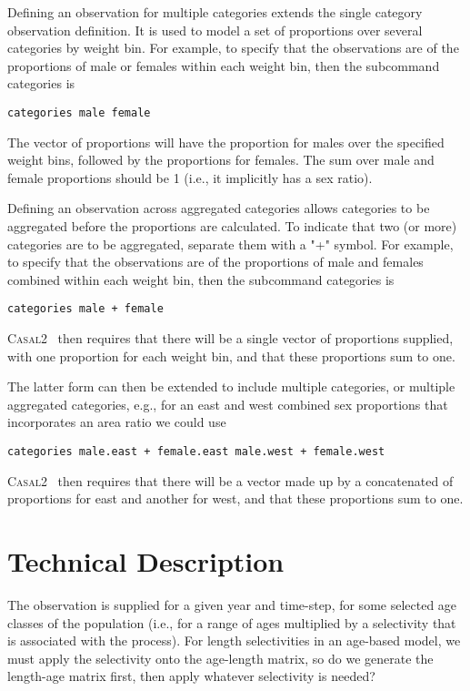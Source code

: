 \documentclass[a4paper,11pt,twoside,pdftex,draft]{article}
\newcommand{\CNAME}{\textsc{Casal2}}
\begin{document}
Defining an observation for multiple categories extends the single category observation definition. It is used to model a set of proportions over several categories by weight bin. For example, to specify that the observations are of the proportions of male or females within each weight bin, then the subcommand categories is

\texttt{categories male female}

The vector of proportions will have the proportion for males over the specified weight bins, followed by the proportions for females. The sum over male and female proportions should be 1 (i.e., it implicitly has a sex ratio).

Defining an observation across aggregated categories allows categories to be aggregated before the proportions are calculated.  To indicate that two (or more) categories are to be aggregated, separate them with a "+" symbol. For example, to specify that the observations are of the proportions of male and females combined within each weight bin, then the subcommand categories is

\texttt{categories male + female}

\CNAME~ then requires that there will be a single vector of proportions supplied, with one proportion for each weight bin, and that these proportions sum to one.

The latter form can then be extended to include multiple categories, or multiple aggregated categories, e.g., for an east and west combined sex proportions that incorporates an area ratio we could use

\texttt{categories male.east + female.east   male.west + female.west}

\CNAME~ then requires that there will be a vector made up by a concatenated of proportions for east and another for west, and that these proportions sum to one.

\section{Technical Description}


The observation is supplied for a given year and time-step, for some selected age classes of the population (i.e., for a range of ages multiplied by a selectivity that is associated with the process).
For length selectivities in an age-based model, we must apply the selectivity onto the age-length matrix, so do we generate the length-age matrix first, then apply whatever selectivity is needed?
\end{document}
